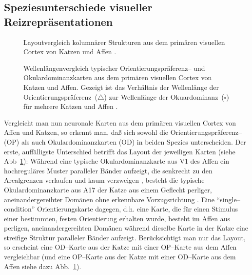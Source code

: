 \subsection{Speziesunterschiede visueller Reizrepräsentationen}
\label{unterschiede}

\begin{figure}[p]
\begin{center}
\end{center}
\caption{Layoutvergleich kolumnärer Strukturen aus dem primären visuellen
Cortex von Katzen \protect{} und Affen
\protect{}.}
\label{layout}
\end{figure}

\begin{figure}[p]
\begin{center}
\end{center}
\caption{Wellenlängenvergleich typischer Orientierungspräferenz-- und
Okulardominanzkarten aus dem primären visuellen Cortex von Katzen und
Affen. Gezeigt ist das Verhältnis der Wellenlänge der
Orientierungspräferenz~($\triangle$) zur Wellenlänge der
Okuardominanz~($\square$) für mehrere Katzen
\protect{} und Affen
\protect{}.}
\label{wavelength}
\end{figure}

Vergleicht man nun neuronale Karten aus dem primären visuellen Cortex von
Affen und Katzen, so erkennt man, daß sich sowohl die
Orientierungspräferenz-- (OP) als auch Okulardominanzkarten (OD) in beiden
Spezies unterscheiden. Der erste, auffälligste Unterschied betrifft das
Layout der jeweiligen Karten (siehe Abb~\ref{layout}): Während eine
typische Okulardominanzkarte aus V1 des Affen ein hochreguläres Muster
paralleler Bänder aufzeigt, die senkrecht zu den Arealgrenzen verlaufen
und kaum verzweigen \cite{levayetal:1985,grinvald:1991}, besteht die
typische Okulardominanzkarte aus A17 der Katze aus einem Geflecht perliger,
aneinandergereihter Domänen ohne erkennbare Vorzugsrichtung
\cite{andersonetal:1988,loewel:1987}.  Eine ``single--condition''
Orientierungskarte dagegen, d.h. eine Karte, die für einen Stimulus einer
bestimmten, festen Orientierung erhalten wurde, besteht im Affen aus
perligen, aneinandergereihten Domänen während dieselbe Karte in der Katze
eine streifige Struktur paralleler Bänder aufzeigt.  Berücksichtigt man
nur das Layout, so erscheint eine OD--Karte aus der Katze mit einer
OP--Karte aus dem Affen vergleichbar (und eine OP--Karte aus der Katze mit
einer OD--Karte aus dem Affen siehe dazu Abb.~\ref{layout}).

